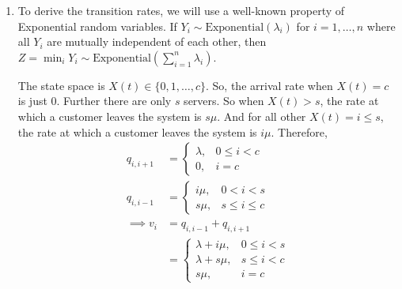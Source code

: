\documentclass[11pt]{article}
\begin{document}
\begin{enumerate}

\item To derive the transition rates, we will use a well-known property of Exponential random variables. If $Y_i \sim \text{Exponential}(\lambda_i)$ for $i = 1, \dots, n$ where all $Y_i$ are mutually independent of each other, then $Z = \min_i Y_i \sim \text{Exponential}(\sum_{i=1}^n \lambda_i)$.

The state space is $X(t) \in \{0,1, \dots, c\}$. So, the arrival rate when $X(t) = c$ is just 0. Further there are only $s$ servers. So when $X(t) > s$, the rate at which a customer leaves the system is $s \mu$. And for all other $X(t) = i \leq s$, the rate at which a customer leaves the system is $i \mu$. Therefore,
\begin{align*}
	q_{i, i+1} &= \begin{cases}
	\lambda, & 0 \leq i < c \\
	0, & i = c
	\end{cases} \\
	q_{i, i-1} &= \begin{cases}
	i \mu, & 0 < i < s \\
	s \mu, & s \leq i \leq c
	\end{cases} \\
	\implies v_i &= q_{i, i-1} + q_{i, i+1} \\
	&=  \begin{cases}
	\lambda + i \mu, & 0 \leq i < s \\
	\lambda + s \mu, & s \leq i < c \\
	s \mu, & i = c
	\end{cases}
\end{align*}


\end{enumerate}
\end{document}
